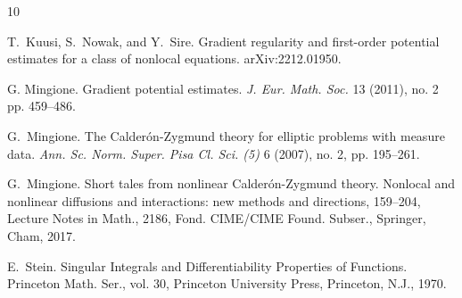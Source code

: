 \documentclass[10pt,letterpaper]{amsart}
\theoremstyle{definition}
\numberwithin{theorem}{section}
\numberwithin{equation}{section}
\newcommand{\1}{\ensuremath{\mathds{1}}}
\numberwithin{equation}{section}
\begin{document}
\begin{thebibliography}{10}
%

\newblock T.~Kuusi, S.~Nowak, and Y.~Sire. 
\newblock Gradient regularity and first-order potential estimates for a class of nonlocal equations.
\newblock arXiv:2212.01950.

\newblock G. Mingione. 
\newblock Gradient potential estimates. 
\newblock \emph{J. Eur. Math. Soc.}
13 (2011), no. 2 pp. 459--486.

\newblock G.~Mingione.
\newblock The Calder\'on-Zygmund theory for elliptic problems with measure data. 
\newblock \emph{Ann. Sc. Norm. Super. Pisa Cl. Sci. (5)} 6 (2007), no. 2,
pp. 195--261.

\newblock G.~Mingione.
\newblock Short tales from nonlinear Calderón-Zygmund theory. Nonlocal and nonlinear diffusions and interactions: new methods and directions, 159–204, Lecture Notes in Math., 2186, Fond. CIME/CIME Found. Subser., Springer, Cham, 2017.



E.~Stein. Singular Integrals and Differentiability Properties of Functions. Princeton Math. Ser., vol. 30, Princeton University Press,
Princeton, N.J., 1970.








\end{thebibliography}
\end{document}
